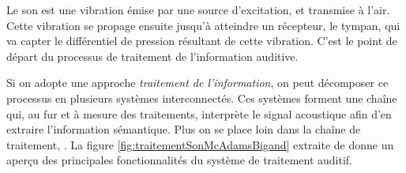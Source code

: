 Le son est une vibration émise par une source d'excitation, et transmise à l'air. Cette vibration se propage ensuite jusqu'à atteindre un récepteur, le tympan, qui va capter le différentiel de pression résultant de cette vibration. C'est le point de départ du processus de traitement de l'information auditive. 

Si on adopte une approche \emph{traitement de l'information}, on peut décomposer ce processus en plusieurs systèmes interconnectés. Ces systèmes forment une chaîne qui, au fur et à mesure des traitements, interprète le signal acoustique afin d'en extraire l'information sémantique. Plus on se place loin dans la chaîne de traitement,  . La figure \ref{fig:traitementSonMcAdamsBigand} extraite de \citep{mcadams1994penser} donne un aperçu des principales fonctionnalités du système de traitement auditif.

